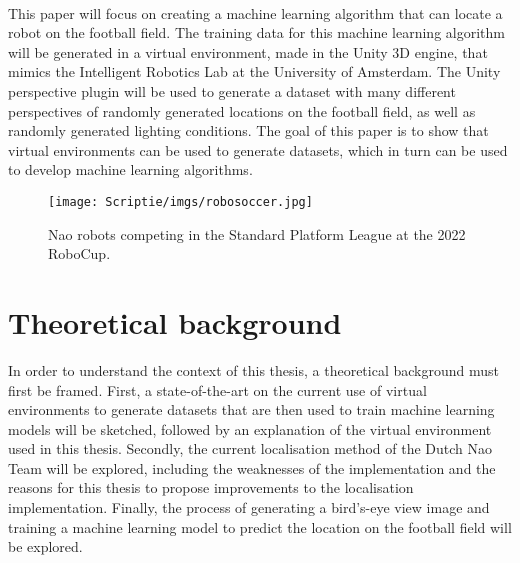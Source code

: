 \documentclass{uva-inf-bachelor-thesis}
\begin{document}
    \hfill \break \\
    This paper will focus on creating a machine learning algorithm that can locate a robot on the football field. The training data for this machine learning algorithm will be generated in a virtual environment, made in the Unity 3D engine, that mimics the Intelligent Robotics Lab at the University of Amsterdam. The Unity perspective plugin \cite{unity} will be used to generate a dataset with many different perspectives of randomly generated locations on the football field, as well as randomly generated lighting conditions. The goal of this paper is to show that virtual environments can be used to generate datasets, which in turn can be used to develop machine learning algorithms.
    \hfill \break \\
    \begin{figure}[H]
    \centering
    \texttt{[image: Scriptie/imgs/robosoccer.jpg]}
    \caption{Nao robots competing in the Standard Platform League at the 2022 RoboCup.}
    \end{figure}

\chapter{Theoretical background}
    In order to understand the context of this thesis, a theoretical background must first be framed. First, a state-of-the-art on the current use of virtual environments to generate datasets that are then used to train machine learning models will be sketched, followed by an explanation of the virtual environment used in this thesis. Secondly, the current localisation method of the Dutch Nao Team will be explored, including the weaknesses of the implementation and the reasons for this thesis to propose improvements to the localisation implementation. Finally, the process of generating a bird's-eye view image and training a machine learning model to predict the location on the football field will be explored. 
    
\end{document}
